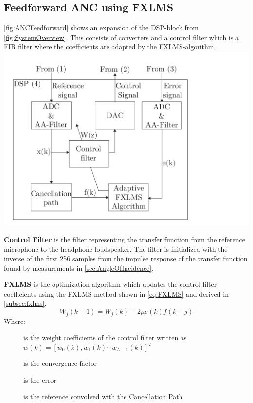\subsection*{Feedforward ANC using FXLMS}
\autoref{fig:ANCFeedforward} shows an expansion of the DSP-block from \autoref{fig:SystemOverview}. This consists of converters and a control filter which is a FIR filter where the coefficients are adapted by the FXLMS-algorithm. 
{
	\includegraphics[width=1\columnwidth]{figures/ArticleIllustrations/ANCFeedForward}
	\label{fig:ANCFeedforward}
}



\textbf{Control Filter} is the filter representing the transfer function from the reference microphone to the headphone loudspeaker. The filter is initialized with the inverse of the first 256 samples from the impulse response of the transfer function found by measurements in \autoref{sec:AngleOfIncidence}.  

\textbf{FXLMS} is the optimization algorithm which updates the control filter coefficients using the FXLMS method shown in \autoref{eq:FXLMS} and derived in \autoref{subsec:fxlms}. 
\begin{equation}\label{eq:FXLMS}
W_j(k+1) = W_j(k) - 2\mu e(k)f(k-j) 
\end{equation}
Where:
\vspace{-8mm} %
\begin{description}
	\item[] is the weight coefficients of the control filter written as  $w(k)=[w_0(k),w_1(k) \cdots w_{L-1}(k)]^T$
	\item[\text{$\mu$}] is the convergence factor
	\item[] is the error 
	\item[] is the reference convolved with the Cancellation Path
\end{description}

